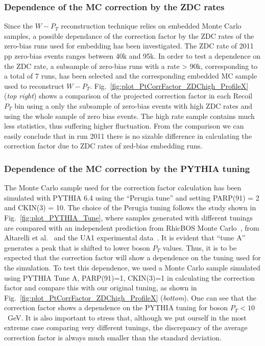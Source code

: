 \documentclass[12pt]{article}
\begin{document}
\subsubsection{Dependence of the MC correction by the ZDC rates}
Since the $W-P_{T}$ reconstruction technique relies on embedded Monte Carlo samples, a possible dependance of the correction factor by the ZDC rates of the zero-bias runs used for embedding has been investigated. The ZDC rate of 2011 pp zero-bias events ranges between 40k and 95k. In order to test a dependence on the ZDC rate, a subsample of zero-bias runs with a rate > 90k, corresponding to a total of 7 runs, has been selected and the corresponding embedded MC sample used  to reconstruct $W-P_{T}$. Fig.~\ref{fig:plot_PtCorrFactor_ZDChigh_ProfileX} ({\it top right}) shows a comparison of the projected correction factor in each Recoil $P_{T}$ bin using a only the subsample of zero-bias events with high ZDC rates and using the whole sample of zero bias events. The high rate sample contains much less statistics, thus suffering higher fluctuation. From the comparison we can easily conclude that in run 2011 there is no sizable difference in calculating the correction factor due to ZDC rates of zed-bias embedding runs. 

\subsubsection{Dependence of the MC correction by the PYTHIA tuning}
The Monte Carlo sample used for the correction factor calculation has been simulated with PYTHIA 6.4 using the ``Perugia tune'' and setting PARP(91) = 2 and CKIN(3) = 10. The choice of the Perugia tuning follows the study shown in Fig.~\ref{fig:plot_PYTHIA_Tune}, where samples generated with different tunings are compared with an independent prediction from RhicBOS Monte Carlo~\cite{RhicBOS}, from Altarelli et al.~\cite{Altarelli} and the UA1 experimental data~\cite{UA1}. It is evident that ``tune A'' generates a peak that is shifted to lower boson $P_{T}$ values.  Thus, it is to be expected that the correction factor will show a dependence on the tuning used for the simulation. To test this dependence, we used a Monte Carlo sample simulated using PYTHIA Tune A, PARP(91)=1, CKIN(3)=1 in calculating the correction factor and compare this with our original tuning, as shown in Fig.~\ref{fig:plot_PtCorrFactor_ZDChigh_ProfileX} ({\it bottom}). One can see that the correction factor shows a dependence on the PYTHIA tuning for boson $P_{T} < 10$~GeV. It is also important to stress that, although we put ourself in the most extreme case comparing very different tunings, the discrepancy of the average correction factor is always much smaller than the standard deviation.
\end{document}
